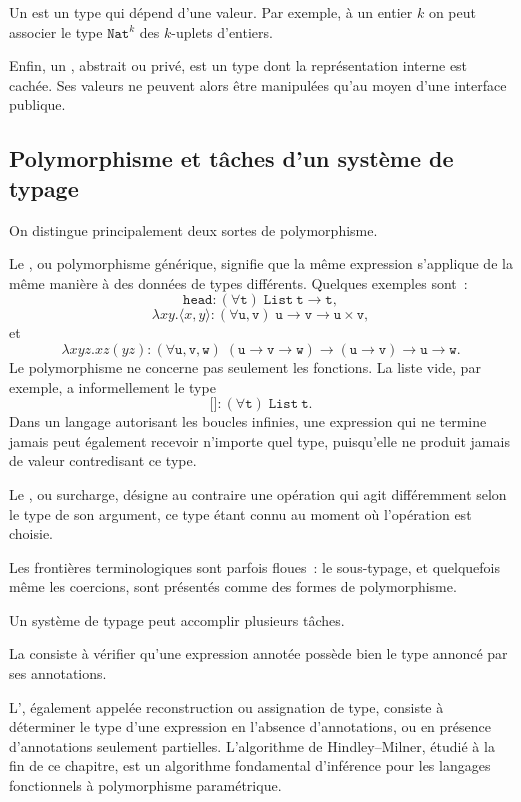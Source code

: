 Un  est un type qui dépend d'une valeur. Par
exemple, à un entier $k$ on peut associer le type $\texttt{Nat}^k$ des
$k$-uplets d'entiers.

Enfin, un , abstrait ou privé, est un type dont la
représentation interne est cachée. Ses valeurs ne peuvent alors être
manipulées qu'au moyen d'une interface publique.

\subsection{Polymorphisme et tâches d'un système de typage}

\thingy On distingue principalement deux sortes de polymorphisme.

Le , ou polymorphisme générique,
signifie que la même expression s'applique de la même manière à des
données de types différents. Quelques exemples sont :
\[
\texttt{head} :
(\forall\mathtt{t})\;
\texttt{List}~\mathtt{t}\to\mathtt{t},
\]
\[
\lambda xy.\langle x,y\rangle :
(\forall\mathtt{u},\mathtt{v})\;
\mathtt{u}\to\mathtt{v}\to
\mathtt{u}\times\mathtt{v},
\]
et
\[
\lambda xyz.xz(yz) :
(\forall\mathtt{u},\mathtt{v},\mathtt{w})\;
(\mathtt{u}\to\mathtt{v}\to\mathtt{w})
\to(\mathtt{u}\to\mathtt{v})
\to\mathtt{u}\to\mathtt{w}.
\]
Le polymorphisme ne concerne pas seulement les fonctions. La liste
vide, par exemple, a informellement le type
\[
\texttt{[]} :
(\forall\mathtt{t})\;\texttt{List}~\mathtt{t}.
\]
Dans un langage autorisant les boucles infinies, une expression qui ne
termine jamais peut également recevoir n'importe quel type, puisqu'elle
ne produit jamais de valeur contredisant ce type.

Le , ou surcharge, désigne au contraire une
opération qui agit différemment selon le type de son argument, ce type
étant connu au moment où l'opération est choisie.

Les frontières terminologiques sont parfois floues : le sous-typage,
et quelquefois même les coercions, sont présentés comme des formes de
polymorphisme.

\thingy Un système de typage peut accomplir plusieurs tâches.

La  consiste à vérifier qu'une expression
annotée possède bien le type annoncé par ses annotations.

L', également appelée reconstruction ou
assignation de type, consiste à déterminer le type d'une expression en
l'absence d'annotations, ou en présence d'annotations seulement
partielles. L'algorithme de Hindley--Milner, étudié à la fin de ce
chapitre, est un algorithme fondamental d'inférence pour les langages
fonctionnels à polymorphisme paramétrique.

